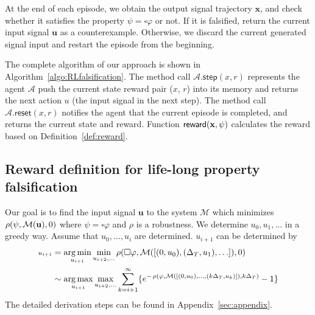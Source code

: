 At the end of each episode,
we obtain the output signal trajectory $\mathbf{x}$,
and check whether it satisfies the property $\psi = \square \varphi$ or not.
If it is falsified, return the current input signal $\mathbf{u}$ as a counterexample.
Otherwise, we discard the current generated signal input
and restart the episode from the beginning.

The complete algorithm of our approach is shown in Algorithm~\ref{algo:RLfalsification}.
The method call $\mathcal{A}.\mathsf{step}(x, r)$ represents
the agent $\mathcal{A}$ push the current state reward pair ($x$, $r$) into its memory
and returns the next action $u$ (the input signal in the next step).
The method call $\mathcal{A}.\mathsf{reset}(x, r)$ notifies the agent that the current episode is completed, and returns the current state and reward.
Function $\operatorname{\mathsf{reward}}(\mathbf{x}, \psi)$ calculates the reward based on Definition~\ref{def:reward}.



\subsection{Reward definition for life-long property falsification}\label{subsec:reward}
Our goal is to find the input signal $\mathbf{u}$ to the
system $\mathcal{M}$ which minimizes $\operatorname{\rho}(\psi, \mathcal{M}(\mathbf{u}), 0)$ where $\psi = \square \varphi$ and $\rho$ is a robustness.
We determine $u_0, u_1, \ldots$ in a greedy way.
Assume that $u_0, \ldots, u_i$ are determined.
$u_{i+1}$ can be determined by
\begin{align}
\scriptstyle
\label{eq:action}
  u_{i+1} &= \operatorname*{arg\,min}_{u_{i+1}} \min_{u_{i+2}, \ldots} \operatorname{\rho}(\square \varphi, \mathcal{M}(\left[(0, u_0), (\Delta_T, u_1), \ldots \right]), 0) \\
  &\sim \operatorname*{arg\,max}_{u_{i+1}} \max_{u_{i+2}, \ldots} \sum_{k=i+1}^\infty \{ e^{- \operatorname{\rho}(\varphi, \mathcal{M}(\left[(0, u_0), \ldots, (k\Delta_T, u_k) \right]), k\Delta_T)} - 1\} \label{eq:r}
\end{align}
The detailed derivation steps can be found in Appendix~\ref{sec:appendix}.

